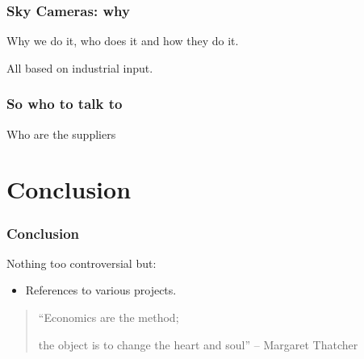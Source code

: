 \documentclass[a4paper,handout]{beamer}
\begin{document}
\begin{frame}\frametitle{Sky Cameras: why}
Why we do it, who does it and how they do it.

All based on industrial input.
\end{frame}

\begin{frame}\frametitle{So who to talk to}
Who are the suppliers
\end{frame}

\section{Conclusion}
\begin{frame}\frametitle{Conclusion}
Nothing too controversial but:
\begin{itemize}
\item References to various projects.
\end{itemize}
\pause
\begin{quote}
``Economics are the method; 

\pause
the object is to change the heart and soul'' -- Margaret Thatcher
\end{quote}
\end{frame}
\end{document}
